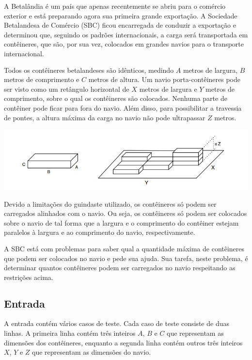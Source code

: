 A Betalândia é um país que apenas recentemente se abriu para o comércio exterior
e está preparando agora sua primeira grande exportação. A Sociedade Betalandesa
de Comércio (SBC) ficou encarregada de conduzir a exportação e determinou que,
seguindo os padrões internacionais, a carga será transportada em contêineres,
que são, por sua vez, colocados em grandes navios para o transporte
internacional.

Todos os contêineres betalandeses são idênticos, medindo $A$ metros de largura,
$B$ metros de comprimento e $C$ metros de altura. Um navio porta-contêineres pode
ser visto como um retângulo horizontal de $X$ metros de largura e $Y$ metros de
comprimento, sobre o qual os contêineres são colocados. Nenhuma parte de
contêiner pode ficar para fora do navio. Além disso, para possibilitar a
travessia de pontes, a altura máxima da carga no navio não pode ultrapassar $Z$
metros.

\begin{center}
\includegraphics[scale=0.6]{problems/transporte/imagens/transporte.jpg}
\end{center}


Devido a limitações do guindaste utilizado, os contêineres só podem ser
carregados alinhados com o navio. Ou seja, os contêineres só podem ser colocados
sobre o navio de tal forma que a largura e o comprimento do contêiner estejam
paralelos à largura e ao comprimento do navio, respectivamente.

A SBC está com problemas para saber qual a quantidade máxima de contêineres que
podem ser colocados no navio e pede sua ajuda. Sua tarefa, neste problema, é
determinar quantos contêineres podem ser carregados no navio respeitando as
restrições acima.

\subsection*{Entrada}

A entrada contém vários casos de teste. Cada caso de teste consiste de duas
linhas. A primeira linha contém três inteiros $A$, $B$ e $C$ que representam as
dimensões dos contêineres, enquanto a segunda linha contém
outros três inteiros $X$, $Y$ e $Z$ que representam as dimensões do navio.

